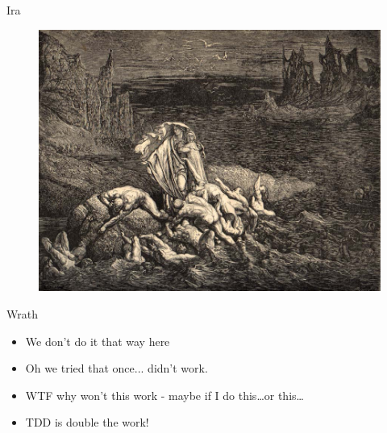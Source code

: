 \documentclass[12pt,xcolor=x11names]{beamer}
\begin{document}
\begin{frame}{Ira}
    \begin{figure}
        \centering \includegraphics[height=0.75\textheight]{wrath.jpg}
    \end{figure}
\end{frame}
\begin{frame}{Wrath}
    \begin{itemize}
        \item We don't do it that way here
        \item Oh we tried that once... didn't work.
        \item WTF why won't this work - maybe if I do this\ldots or this\ldots
        \item TDD is double the work!
    \end{itemize}
\end{frame}
\end{document}
